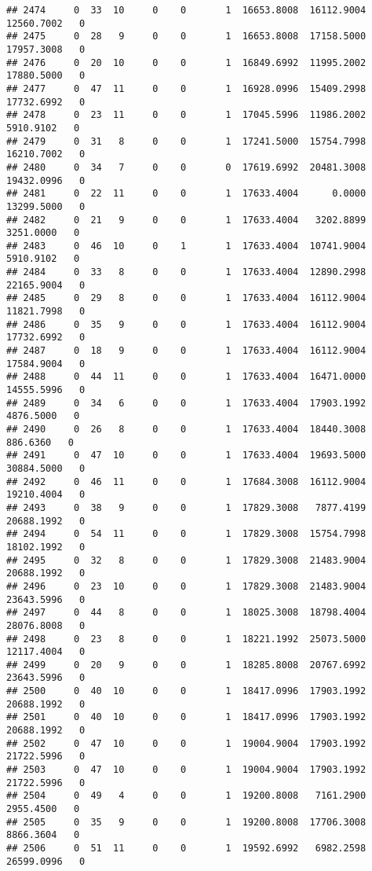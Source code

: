 \documentclass[
]{article}
\begin{document}
\begin{enumerate}
\begin{verbatim}
## 2474     0  33  10     0    0       1  16653.8008  16112.9004  12560.7002   0
## 2475     0  28   9     0    0       1  16653.8008  17158.5000  17957.3008   0
## 2476     0  20  10     0    0       1  16849.6992  11995.2002  17880.5000   0
## 2477     0  47  11     0    0       1  16928.0996  15409.2998  17732.6992   0
## 2478     0  23  11     0    0       1  17045.5996  11986.2002   5910.9102   0
## 2479     0  31   8     0    0       1  17241.5000  15754.7998  16210.7002   0
## 2480     0  34   7     0    0       0  17619.6992  20481.3008  19432.0996   0
## 2481     0  22  11     0    0       1  17633.4004      0.0000  13299.5000   0
## 2482     0  21   9     0    0       1  17633.4004   3202.8899   3251.0000   0
## 2483     0  46  10     0    1       1  17633.4004  10741.9004   5910.9102   0
## 2484     0  33   8     0    0       1  17633.4004  12890.2998  22165.9004   0
## 2485     0  29   8     0    0       1  17633.4004  16112.9004  11821.7998   0
## 2486     0  35   9     0    0       1  17633.4004  16112.9004  17732.6992   0
## 2487     0  18   9     0    0       1  17633.4004  16112.9004  17584.9004   0
## 2488     0  44  11     0    0       1  17633.4004  16471.0000  14555.5996   0
## 2489     0  34   6     0    0       1  17633.4004  17903.1992   4876.5000   0
## 2490     0  26   8     0    0       1  17633.4004  18440.3008    886.6360   0
## 2491     0  47  10     0    0       1  17633.4004  19693.5000  30884.5000   0
## 2492     0  46  11     0    0       1  17684.3008  16112.9004  19210.4004   0
## 2493     0  38   9     0    0       1  17829.3008   7877.4199  20688.1992   0
## 2494     0  54  11     0    0       1  17829.3008  15754.7998  18102.1992   0
## 2495     0  32   8     0    0       1  17829.3008  21483.9004  20688.1992   0
## 2496     0  23  10     0    0       1  17829.3008  21483.9004  23643.5996   0
## 2497     0  44   8     0    0       1  18025.3008  18798.4004  28076.8008   0
## 2498     0  23   8     0    0       1  18221.1992  25073.5000  12117.4004   0
## 2499     0  20   9     0    0       1  18285.8008  20767.6992  23643.5996   0
## 2500     0  40  10     0    0       1  18417.0996  17903.1992  20688.1992   0
## 2501     0  40  10     0    0       1  18417.0996  17903.1992  20688.1992   0
## 2502     0  47  10     0    0       1  19004.9004  17903.1992  21722.5996   0
## 2503     0  47  10     0    0       1  19004.9004  17903.1992  21722.5996   0
## 2504     0  49   4     0    0       1  19200.8008   7161.2900   2955.4500   0
## 2505     0  35   9     0    0       1  19200.8008  17706.3008   8866.3604   0
## 2506     0  51  11     0    0       1  19592.6992   6982.2598  26599.0996   0

\end{verbatim}
\end{enumerate}
\end{document}
